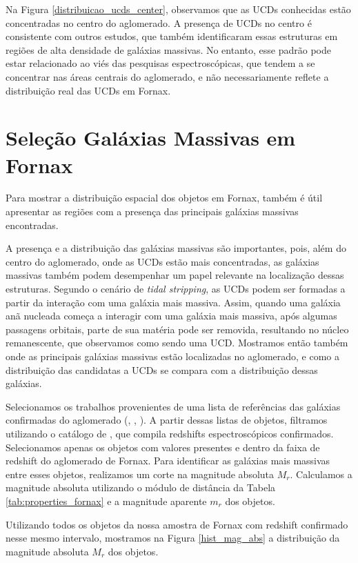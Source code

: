 Na Figura \ref{distribuicao_ucds_center}, observamos que as UCDs conhecidas estão concentradas no centro do aglomerado. A presença de UCDs no centro é consistente com outros estudos, que também identificaram essas estruturas em regiões de alta densidade de galáxias massivas. No entanto, esse padrão pode estar relacionado ao viés das pesquisas espectroscópicas, que tendem a se concentrar nas áreas centrais do aglomerado, e não necessariamente reflete a distribuição real das UCDs em Fornax.

\section{Seleção Galáxias Massivas em Fornax}\label{subsec:galaxias_massivas}
Para mostrar a distribuição espacial dos objetos em Fornax, também é útil apresentar as regiões com a presença das principais galáxias massivas encontradas. 

A presença e a distribuição das galáxias massivas são importantes, pois, além do centro do aglomerado, onde as UCDs estão mais concentradas, as galáxias massivas também podem desempenhar um papel relevante na localização dessas estruturas. Segundo o cenário de {\it tidal stripping}, as UCDs podem ser formadas a partir da interação com uma galáxia mais massiva. Assim, quando uma galáxia anã nucleada começa a interagir com uma galáxia mais massiva, após algumas passagens orbitais, parte de sua matéria pode ser removida, resultando no núcleo remanescente, que observamos como sendo uma UCD. Mostramos então também onde as principais galáxias massivas estão localizadas no aglomerado, e como a distribuição das candidatas a UCDs se compara com a distribuição dessas galáxias.

Selecionamos os trabalhos provenientes de uma lista de referências das galáxias confirmadas do aglomerado (\citealp{Ferguson_1989}, \citealp{Jordan_2007}, \citealp{Venhola_2018}). A partir dessas listas de objetos, filtramos utilizando o catálogo de \cite{Lima_2024}, que compila redshifts espectroscópicos confirmados. Selecionamos apenas os objetos com valores presentes e dentro da faixa de redshift do aglomerado de Fornax. Para identificar as galáxias mais massivas entre esses objetos, realizamos um corte na magnitude absoluta $M_r$. Calculamos a magnitude absoluta utilizando o módulo de distância da Tabela \ref{tab:properties_fornax} e a magnitude aparente $m_r$ dos objetos.

Utilizando todos os objetos da nossa amostra de Fornax com redshift confirmado nesse mesmo intervalo, mostramos na Figura \ref{hist_mag_abs} a distribuição da magnitude absoluta $M_r$ dos objetos.

